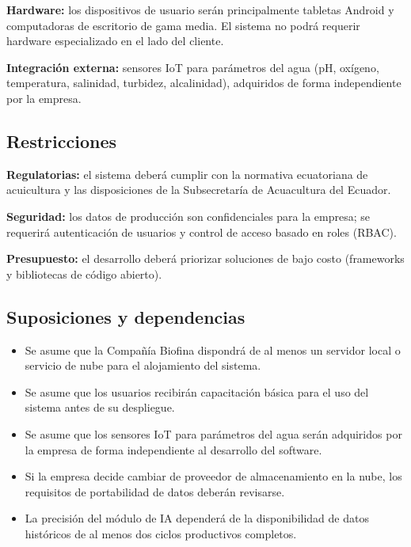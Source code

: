 \documentclass[11pt,a4paper]{article}
\begin{document}
\textbf{Hardware:} los dispositivos de usuario serán principalmente tabletas Android y computadoras de escritorio de gama media. El sistema no podrá requerir hardware especializado en el lado del cliente.

\textbf{Integración externa:} sensores IoT para parámetros del agua (pH, oxígeno, temperatura, salinidad, turbidez, alcalinidad), adquiridos de forma independiente por la empresa.

\subsection{Restricciones}

\textbf{Regulatorias:} el sistema deberá cumplir con la normativa ecuatoriana de acuicultura y las disposiciones de la Subsecretaría de Acuacultura del Ecuador.


\textbf{Seguridad:} los datos de producción son confidenciales para la empresa; se requerirá autenticación de usuarios y control de acceso basado en roles (RBAC).


\textbf{Presupuesto:} el desarrollo deberá priorizar soluciones de bajo costo (frameworks y bibliotecas de código abierto).

\subsection{Suposiciones y dependencias}
\begin{itemize}
    \item Se asume que la Compañía Biofina dispondrá de al menos un servidor local o servicio de nube para el alojamiento del sistema.
    
    \item Se asume que los usuarios recibirán capacitación básica para el uso del sistema antes de su despliegue.
    
    \item Se asume que los sensores IoT para parámetros del agua serán adquiridos por la empresa de forma independiente al desarrollo del software.
    
    \item Si la empresa decide cambiar de proveedor de almacenamiento en la nube, los requisitos de portabilidad de datos deberán revisarse.
    
    \item La precisión del módulo de IA dependerá de la disponibilidad de datos históricos de al menos dos ciclos productivos completos.
\end{itemize}
\end{document}
